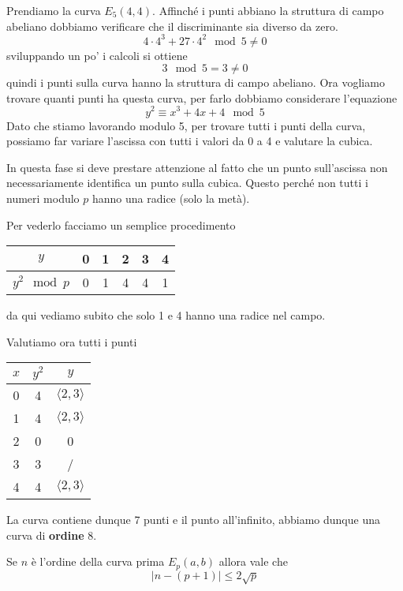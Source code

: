 \begin{example}
	Prendiamo la curva $E_5(4, 4)$. Affinch\'e i punti abbiano la struttura di campo abeliano dobbiamo verificare
	che il discriminante sia diverso da zero.
	\[ 4 \cdot 4^3 + 27 \cdot 4^2 \mod{5} \neq 0 \]
	sviluppando un po' i calcoli si ottiene
	\[ 3 \mod{5} = 3 \neq 0 \]
	quindi i punti sulla curva hanno la struttura di campo abeliano. Ora vogliamo trovare quanti punti ha questa
	curva, per farlo dobbiamo considerare l'equazione
	\[ y^2 \equiv x^3 + 4x + 4 \mod{5} \]
	Dato che stiamo lavorando modulo 5, per trovare tutti i punti della curva, possiamo far variare l'ascissa con
	tutti i valori da 0 a 4 e valutare la cubica.

	In questa fase si deve prestare attenzione al fatto che un punto sull'ascissa non necessariamente identifica
	un punto sulla cubica. Questo perch\'e non tutti i numeri modulo $p$ hanno una radice (solo la met\`a).

	Per vederlo facciamo un semplice procedimento
	\begin{center}
		\begin{tabular}{ c | c c c c c }
			$y$           & 0 & 1 & 2 & 3 & 4 \\
			\hline
			$y^2 \mod{p}$ & 0 & 1 & 4 & 4 & 1
		\end{tabular}
	\end{center}
	da qui vediamo subito che solo 1 e 4 hanno una radice nel campo.

	Valutiamo ora tutti i punti
	\begin{center}
		\begin{tabular}{ c | c | c }
			$x$ & $y^2$ & $y$                    \\
			\hline
			0   & 4     & $\langle 2, 3 \rangle$ \\
			1   & 4     & $\langle 2, 3 \rangle$ \\
			2   & 0     & 0                      \\
			3   & 3     & /                      \\
			4   & 4     & $\langle 2, 3 \rangle$
		\end{tabular}
	\end{center}
	La curva contiene dunque 7 punti e il punto all'infinito, abbiamo dunque una curva di \textbf{ordine} 8.
\end{example}

\begin{theorem}
	Se $n$ \`e l'ordine della curva prima $E_p(a, b)$ allora vale che
	\[ |n - (p + 1)| \leq 2 \sqrt{p} \]
\end{theorem}

